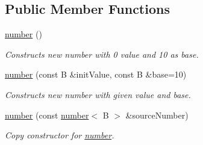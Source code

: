 \subsection*{Public Member Functions}
\begin{DoxyCompactItemize}
\item 
\hypertarget{classcjr_1_1number_a96952d8729d8a96590b5cfa4de8c94f9}{\hyperlink{classcjr_1_1number_a96952d8729d8a96590b5cfa4de8c94f9}{number} ()}\label{classcjr_1_1number_a96952d8729d8a96590b5cfa4de8c94f9}

\begin{DoxyCompactList}\small\item\em Constructs new number with 0 value and 10 as base. \end{DoxyCompactList}\item 
\hyperlink{classcjr_1_1number_aeaf08725e9ae255c3ee25045bbd235f1}{number} (const B \&init\-Value, const B \&base=10)
\begin{DoxyCompactList}\small\item\em Constructs new number with given value and base. \end{DoxyCompactList}\item 
\hyperlink{classcjr_1_1number_aa3ab519d30cba11bfec2177c2b429b8f}{number} (const \hyperlink{classcjr_1_1number}{number}$<$ B $>$ \&source\-Number)
\begin{DoxyCompactList}\small\item\em Copy constructor for \hyperlink{classcjr_1_1number}{number}. \end{DoxyCompactList}\end{DoxyCompactItemize}
